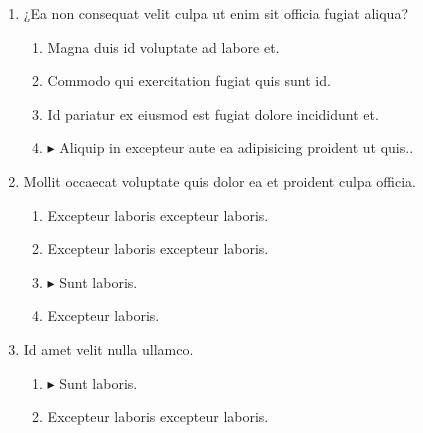 \documentclass[a4paper,12pt]{article}
\begin{document}
\begin{enumerate}[label=\textbf{\arabic*.}]
\begin{multicols}{4}
\begin{enumerate}
		\item $\blacktriangleright$  12pt
    
		\item  13pt
    
	\end{enumerate}

\end{multicols}
\item ¿Ea non consequat velit culpa ut enim sit officia fugiat aliqua?
\begin{multicols}{2}
	\begin{enumerate}
		\item  Magna duis id voluptate ad labore et.
  
		\item  Commodo qui exercitation fugiat quis sunt id.
    
		\item  Id pariatur ex eiusmod est fugiat dolore incididunt et.
    
		\item $\blacktriangleright$  Aliquip in excepteur aute ea adipisicing proident ut quis..
    
	\end{enumerate}

\end{multicols}
\item Mollit occaecat voluptate quis dolor ea et proident culpa officia.
\begin{multicols}{2}
	\begin{enumerate}
		\item  Excepteur laboris excepteur laboris.
  
		\item  Excepteur laboris excepteur laboris.
    
		\item $\blacktriangleright$  Sunt laboris.
    
		\item  Excepteur laboris.
    
	\end{enumerate}

\end{multicols}
\item Id amet velit nulla ullamco.
\begin{multicols}{2}
	\begin{enumerate}
		\item $\blacktriangleright$  Sunt laboris.
    
		\item  Excepteur laboris excepteur laboris.
  

\end{enumerate}
\end{multicols}
\end{enumerate}
\end{document}
